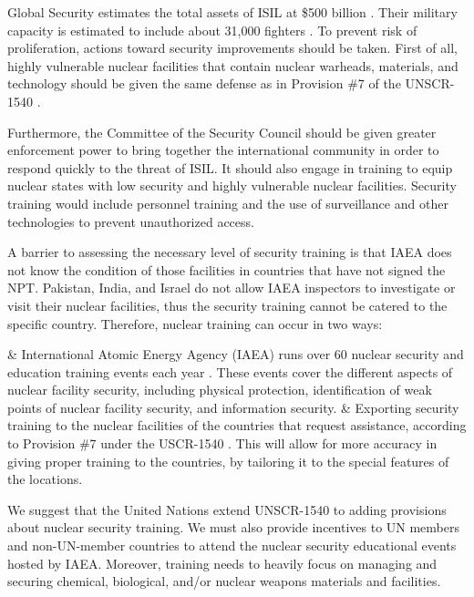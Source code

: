 \documentclass{report}
\begin{document}
Global Security estimates the total assets of ISIL at \$500 billion \cite{GlobalSecurity}. Their  military capacity is estimated to include about 31,000 fighters \cite{BBC2014}. To prevent risk of proliferation, actions toward security improvements should be taken. First of all, highly vulnerable nuclear facilities that contain nuclear warheads, materials, and technology should be given the same defense as in Provision \#7 of the UNSCR-1540 \cite{Gomes2007a}. 

Furthermore, the Committee of the Security Council should be given greater enforcement power to bring together the international community in order to respond quickly to the threat of ISIL. It should also engage in training  to equip nuclear states with low security and highly vulnerable nuclear facilities. Security training would include personnel training and the use of surveillance and other technologies to prevent  unauthorized access. 

A barrier to assessing the necessary level of security training  is that IAEA does not know the condition of those facilities in countries that have not signed the NPT. Pakistan, India, and Israel do not allow IAEA inspectors to investigate or visit their nuclear facilities, thus the security training cannot be catered to the specific country.  Therefore, nuclear training can occur in two ways:


\begin{easylist}[enumerate]
& International Atomic Energy Agency (IAEA) runs over 60 nuclear security and education training events each year \cite{InternationalAtomicEnergyAgency2014}. These events cover the different aspects of nuclear facility security, including physical protection, identification of weak points of nuclear facility security, and information security.
& Exporting security training to the nuclear facilities of the countries that request assistance, according to Provision \#7 under the USCR-1540 \cite{Gomes2007a}. This will allow for more accuracy in giving proper training to the countries, by tailoring it to the special features of the locations.
\end{easylist}


We suggest that the United Nations  extend UNSCR-1540 to adding provisions about nuclear security training. We must also provide incentives to UN members and non-UN-member countries to attend the nuclear security educational events hosted by IAEA. Moreover, training needs to heavily focus on managing and securing  chemical, biological, and/or nuclear weapons materials and facilities. 
\end{document}
